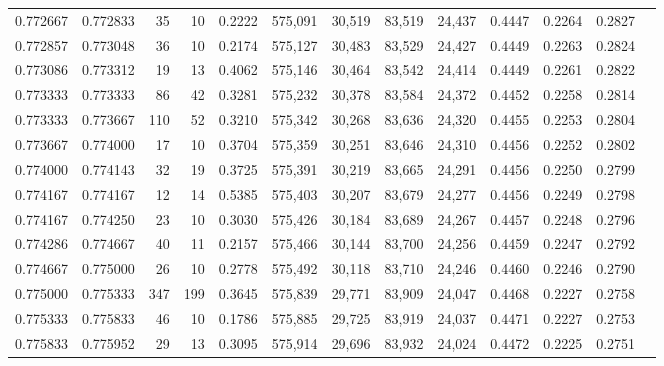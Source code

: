 \begin{tabular}{rrrrrrrrrrrrr}
0.772667 & 0.772833 &    35 &  10 &                                     0.2222 & 575,091 &  30,519 &  83,519 &  24,437 & 0.4447 & 0.2264 & 0.2827 \\
0.772857 & 0.773048 &    36 &  10 &                                     0.2174 & 575,127 &  30,483 &  83,529 &  24,427 & 0.4449 & 0.2263 & 0.2824 \\
0.773086 & 0.773312 &    19 &  13 &                                     0.4062 & 575,146 &  30,464 &  83,542 &  24,414 & 0.4449 & 0.2261 & 0.2822 \\
0.773333 & 0.773333 &    86 &  42 &                                     0.3281 & 575,232 &  30,378 &  83,584 &  24,372 & 0.4452 & 0.2258 & 0.2814 \\
0.773333 & 0.773667 &   110 &  52 &                                     0.3210 & 575,342 &  30,268 &  83,636 &  24,320 & 0.4455 & 0.2253 & 0.2804 \\
0.773667 & 0.774000 &    17 &  10 &                                     0.3704 & 575,359 &  30,251 &  83,646 &  24,310 & 0.4456 & 0.2252 & 0.2802 \\
0.774000 & 0.774143 &    32 &  19 &                                     0.3725 & 575,391 &  30,219 &  83,665 &  24,291 & 0.4456 & 0.2250 & 0.2799 \\
0.774167 & 0.774167 &    12 &  14 &                                     0.5385 & 575,403 &  30,207 &  83,679 &  24,277 & 0.4456 & 0.2249 & 0.2798 \\
0.774167 & 0.774250 &    23 &  10 &                                     0.3030 & 575,426 &  30,184 &  83,689 &  24,267 & 0.4457 & 0.2248 & 0.2796 \\
0.774286 & 0.774667 &    40 &  11 &                                     0.2157 & 575,466 &  30,144 &  83,700 &  24,256 & 0.4459 & 0.2247 & 0.2792 \\
0.774667 & 0.775000 &    26 &  10 &                                     0.2778 & 575,492 &  30,118 &  83,710 &  24,246 & 0.4460 & 0.2246 & 0.2790 \\
0.775000 & 0.775333 &   347 & 199 &                                     0.3645 & 575,839 &  29,771 &  83,909 &  24,047 & 0.4468 & 0.2227 & 0.2758 \\
0.775333 & 0.775833 &    46 &  10 &                                     0.1786 & 575,885 &  29,725 &  83,919 &  24,037 & 0.4471 & 0.2227 & 0.2753 \\
0.775833 & 0.775952 &    29 &  13 &                                     0.3095 & 575,914 &  29,696 &  83,932 &  24,024 & 0.4472 & 0.2225 & 0.2751 \\

\end{tabular}
